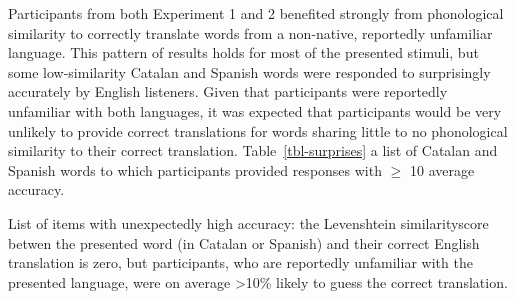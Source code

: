\documentclass[
]{article}
\begin{document}
Participants from both Experiment 1 and 2 benefited strongly from
phonological similarity to correctly translate words from a non-native,
reportedly unfamiliar language. This pattern of results holds for most
of the presented stimuli, but some low-similarity Catalan and Spanish
words were responded to surprisingly accurately by English listeners.
Given that participants were reportedly unfamiliar with both languages,
it was expected that participants would be very unlikely to provide
correct translations for words sharing little to no phonological
similarity to their correct translation. Table~\ref{tbl-surprises} a
list of Catalan and Spanish words to which participants provided
responses with \(\geq\) 10 average accuracy.

\begin{table}

\caption{\label{tbl-surprises}List of items with unexpectedly high
accuracy: the Levenshtein similarityscore betwen the presented word (in
Catalan or Spanish) and their correct English translation is zero, but
participants, who are reportedly unfamiliar with the presented language,
were on average \textgreater10\% likely to guess the correct
translation.}

\centering{

}
\end{table}
\end{document}
